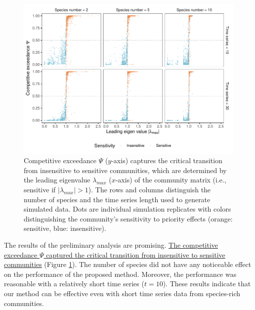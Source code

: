 \documentclass[12pt, class=article, crop=false]{standalone}
\begin{document}
\begin{figure}{\textwidth}
    \centering
    \includegraphics[scale=0.8]{output/figure_eigen_scatter.pdf}
    \caption{Competitive exceedance $\Psi$ ($y$-axis) captures the critical transition from insensitive to sensitive communities, which are determined by the leading eigenvalue $\lambda_{max}$ ($x$-axis) of the community matrix (i.e., sensitive if $|\lambda_{max}| > 1$).
    The rows and columns distinguish the number of species and the time series length used to generate simulated data.
    Dots are individual simulation replicates with colors distinguishing the community's sensitivity to priority effects (orange: sensitive, blue: insensitive).}
    \label{fig:box}
\end{figure}

The results of the preliminary analysis are promising.
\ul{The competitive exceedance $\Psi$ captured the critical transition from insensitive to sensitive communities} (Figure \ref{fig:box}).
The number of species did not have any noticeable effect on the performance of the proposed method.
Moreover, the performance was reasonable with a relatively short time series ($t = 10$).
These results indicate that our method can be effective even with short time series data from species-rich communities. 
\end{document}
